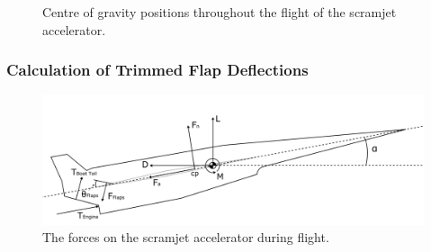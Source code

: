 \begin{figure}
\begin{subfigure}{.5\textwidth}
			\end{subfigure}
			\caption{Centre of gravity positions throughout the flight of the scramjet accelerator. }%
			\label{fig:CentreOfGravity}
		\end{figure}
		
		
		\subsubsection{Calculation of Trimmed Flap Deflections}\label{sec:trim}
		
		
		\begin{figure}[ht]
			\centering
			\includegraphics[width=0.7\linewidth]{figures/3_vehicle_design/SPARTANForces}
			\caption{The forces on the scramjet accelerator during flight.}
			\label{fig:SPARTANForces}
		\end{figure}
		
